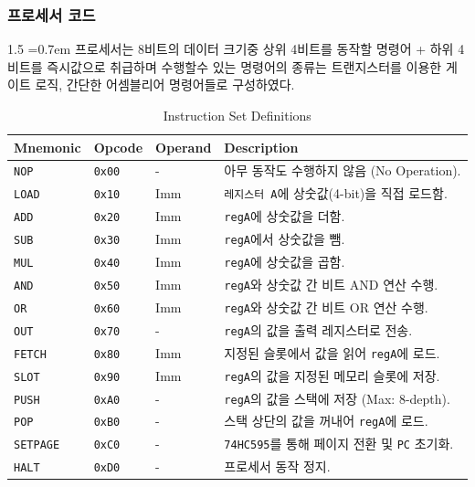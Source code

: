 \documentclass[a4paper, 12pt]{article}
\begin{document}
\subsubsection{프로세서 코드}
\begin{spacing}{1.5}
\font=0.7em    
프로세서는 8비트의 데이터 크기중 상위 4비트를 동작할 명령어 + 하위 4비트를 즉시값으로 취급하며 수행할수 있는 명령어의 종류는 트랜지스터를 이용한 게이트 로직, 간단한 어셈블리어 명령어들로 구성하였다. \par
\vspace{1cm}
\begin{table}[H]
    \centering
    \caption{Instruction Set  Definitions}
    \vspace{0.8em}
    
    \begin{tabularx}{\textwidth}{l l l X}
        \toprule
        \textbf{Mnemonic} & \textbf{Opcode} & \textbf{Operand} & \textbf{Description} \\
        \midrule
        \texttt{NOP}      & \texttt{0x00} & - & 아무 동작도 수행하지 않음 (No Operation). \\
        \texttt{LOAD}     & \texttt{0x10} & Imm & \texttt{레지스터 A}에 상숫값(4-bit)을 직접 로드함. \\
        \texttt{ADD}      & \texttt{0x20} & Imm & \texttt{regA}에 상숫값을 더함. \\
        \texttt{SUB}      & \texttt{0x30} & Imm & \texttt{regA}에서 상숫값을 뺌. \\
        \texttt{MUL}      & \texttt{0x40} & Imm & \texttt{regA}에 상숫값을 곱함. \\
        \texttt{AND}      & \texttt{0x50} & Imm & \texttt{regA}와 상숫값 간 비트 AND 연산 수행. \\
        \texttt{OR}       & \texttt{0x60} & Imm & \texttt{regA}와 상숫값 간 비트 OR 연산 수행. \\
        \addlinespace
        \texttt{OUT}      & \texttt{0x70} & - & \texttt{regA}의 값을 출력 레지스터로 전송. \\
        \texttt{FETCH}    & \texttt{0x80} & Imm & 지정된 슬롯에서 값을 읽어 \texttt{regA}에 로드. \\
        \texttt{SLOT}     & \texttt{0x90} & Imm & \texttt{regA}의 값을 지정된 메모리 슬롯에 저장. \\
        \addlinespace
        \texttt{PUSH}     & \texttt{0xA0} & - & \texttt{regA}의 값을 스택에 저장 (Max: 8-depth). \\
        \texttt{POP}      & \texttt{0xB0} & - & 스택 상단의 값을 꺼내어 \texttt{regA}에 로드. \\
        \texttt{SETPAGE}  & \texttt{0xC0} & - & \texttt{74HC595}를 통해 페이지 전환 및 \texttt{PC} 초기화. \\
        \texttt{HALT}     & \texttt{0xD0} & - & 프로세서 동작 정지. \\
        \bottomrule
    \end{tabularx}
\end{table}


\end{spacing}
\end{document}
